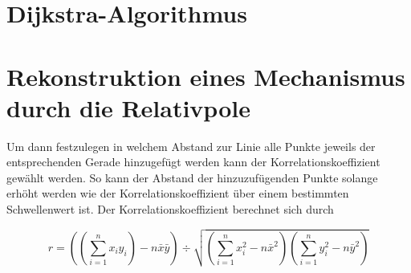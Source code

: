 \section{Dijkstra-Algorithmus}

\section{Rekonstruktion eines Mechanismus durch die Relativpole}


Um dann festzulegen in welchem Abstand zur Linie alle Punkte jeweils der entsprechenden Gerade hinzugefügt werden kann der Korrelationskoeffizient gewählt werden.
So kann der Abstand der hinzuzufügenden Punkte solange erhöht werden wie der Korrelationskoeffizient über einem bestimmten Schwellenwert ist.
Der Korrelationskoeffizient berechnet sich durch

\begin{equation}
    r = \left(\left(\sum_{i=1}^n x_i y_i\right) - n \bar{x} \bar{y}\right) \div \sqrt{\left(\sum_{i=1}^n x_i^2 - n\bar{x}^2\right)\left(\sum_{i=1}^n y_i^2 - n \bar{y}^2\right)}
    \label{eq:korrelationskoeffizient}
\end{equation}


